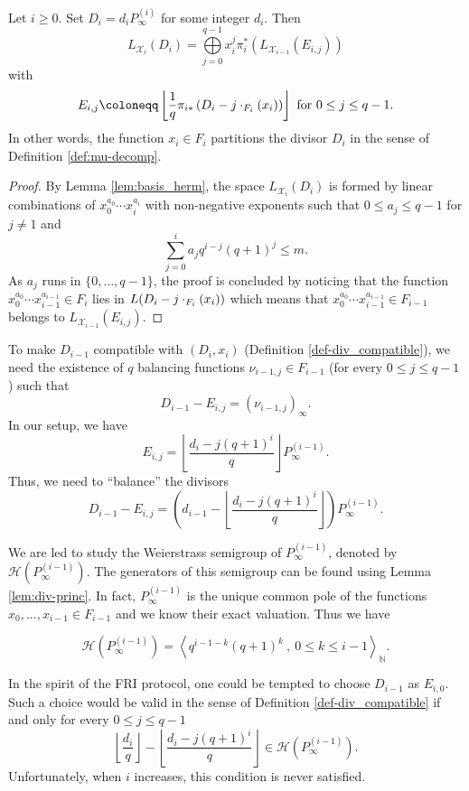 \documentclass[10pt,a4paper]{article}
\newcommand\N{\mathbb{N}}
\let\div\relax\DeclareMathOperator{\div}{div}
\newcommand\calX{\mathcal{X}}
\newcommand\calH{\mathcal{H}}
\newcommand\mydef{\coloneqq}
\theoremstyle{plain}
\theoremstyle{plain}
\theoremstyle{definition}
\theoremstyle{remark}
\theoremstyle{plain}
\begin{document}
\begin{proposition} 
	Let $i \geq 0$. Set $D_i = d_iP^{(i)}_{\infty}$ for some integer $d_i$. Then
	\[L_{\calX_i}(D_i) = \bigoplus\limits_{j=0}^{q-1} x_i^j \pi_i^*\left(L_{\calX_{i-1}}(E_{i,j})\right)\]
	with
	\[E_{i,j} \mydef \left\lfloor \frac{1}{q} \pi_{i*}\left(D_i-j\cdot \div_{F_i}(x_i)\right)\right\rfloor \text{ for } 0 \leq j \leq q-1.\]
	In other words, the function $x_i \in F_i$ partitions the divisor $D_i$ in the sense of Definition \ref{def:mu-decomp}.
\end{proposition}

\begin{proof}
	By Lemma \ref{lem:basis_herm}, the space $L_{\calX_i}(D_i)$ is formed by linear combinations of $x_0^{a_0} \cdots x_i^{a_i}$ with non-negative exponents  such that $0 \leq a_j \leq q-1$ for $j\neq 1$ and \[\sum\limits_{j=0}^i a_jq^{i-j}(q+1)^j \leq m.\] As $a_j$ runs in $\{0,\dots,q-1\}$, the proof is concluded by noticing that the function $x_0^{a_0} \cdots x_{i-1}^{a_{i-1}} \in F_{i}$ lies in $L(D_i-j\cdot\div_{F_i}(x_i))$ which means that $x_0^{a_0} \cdots x_{i-1}^{a_{i-1}} \in F_{i-1}$ belongs to $L_{\calX_{i-1}}(E_{i,j})$.
	
\end{proof}

To make $D_{i-1}$ compatible with $(D_i,x_i)$ (Definition \ref{def-div_compatible}), we need the existence of $q$ balancing functions  $\nu_{i-1,j} \in F_{i-1}$ (for every  $0 \leq j \leq q-1$) such that 
\begin{equation}\label{eq:balancing_fct_herm}
	D_{i-1}-E_{i,j} = (\nu_{i-1,j})_{\infty}.
\end{equation}
In our setup, we have
\[E_{i,j} = \left\lfloor \dfrac{d_i-j(q+1)^i}{q}\right\rfloor P^{(i-1)}_{\infty}.\]
Thus, we need to ``balance'' the divisors
\[D_{i-1}-E_{i,j} = \left(d_{i-1}- \left\lfloor \dfrac{d_i-j(q+1)^i}{q}\right\rfloor\right) P^{(i-1)}_{\infty}.\]


We are led to study the Weierstrass semigroup of $P^{(i-1)}_{\infty}$, denoted by $\calH\left(P^{(i-1)}_{\infty}\right)$. The generators of this semigroup can be found using Lemma \ref{lem:div-princ}. In fact, $P_{\infty}^{(i-1)}$ is the unique common pole of the functions $x_0,...,x_{i-1} \in 
F_{i-1}$ and we know their exact valuation. Thus we have

\[\calH\left(P^{(i-1)}_{\infty}\right) = \left \langle q^{i-1-k}(q+1)^k \ , \ 0\leq k \leq i-1 \right\rangle_{\N}.\]

\begin{remark}\label{rk:big-div-HT}
	In the spirit of the \textsf{FRI} protocol, one could be tempted to choose $D_{i-1}$ as $E_{i,0}$. Such a choice would be valid in the sense of Definition \ref{def-div_compatible} if and only for every $0 \leq j \leq q-1$
	\[ \left\lfloor \dfrac{d_i}{q} \right\rfloor - \left\lfloor \dfrac{d_i-j(q+1)^i}{q}\right\rfloor \in \calH\left(P^{(i-1)}_{\infty}\right).\]
	Unfortunately, when $i$ increases, this condition is never satisfied.
\end{remark}
\end{document}
